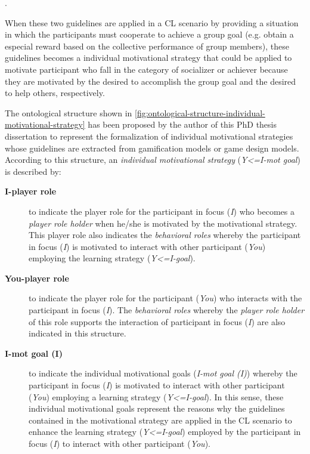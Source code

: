 \begin{citacao}
 .
\end{citacao}

When these two guidelines are applied in a CL scenario by providing a situation in which the participants must cooperate to achieve a group goal (e.g. obtain a especial reward based on the collective performance of group members), these guidelines becomes a individual motivational strategy that could be applied to motivate participant who fall in the category of socializer or achiever because they are motivated by the desired to accomplish the group goal and the desired to help others, respectively.

The ontological structure shown in \autoref{fig:ontological-structure-individual-motivational-strategy} has been proposed by the author of this PhD thesis dissertation to represent the formalization of individual motivational strategies whose guidelines are extracted from gamification models or game design models. According to this structure, an \emph{individual motivational strategy} (\emph{Y<=I-mot goal}) is described by:

\begin{description}
\item[\textbf{I-player role}]
to indicate the player role for the participant in focus (\emph{I}) who becomes a \emph{player role holder} when he/she is motivated by the motivational strategy. This player role also indicates the \emph{behavioral roles} whereby the participant in focus (\emph{I}) is motivated to interact with other participant (\emph{You}) employing the learning strategy (\emph{Y<=I-goal}).

\item[\textbf{You-player role}]
to indicate the player role for the participant (\emph{You}) who interacts with the participant in focus (\emph{I}). The \emph{behavioral roles} whereby the \emph{player role holder} of this role supports the interaction of participant in focus (\emph{I}) are also indicated in this structure.

\item[\textbf{I-mot goal (I)}]
to indicate the individual motivational goals (\emph{I-mot goal (I)}) whereby the participant in focus (\emph{I}) is motivated to interact with other participant (\emph{You}) employing a learning strategy (\emph{Y<=I-goal}). In this sense, these individual motivational goals represent the reasons why the guidelines contained in the motivational strategy are applied in the CL scenario to enhance the learning strategy (\emph{Y<=I-goal}) employed by the participant in focus (\emph{I}) to interact with other participant (\emph{You}).
\end{description}

